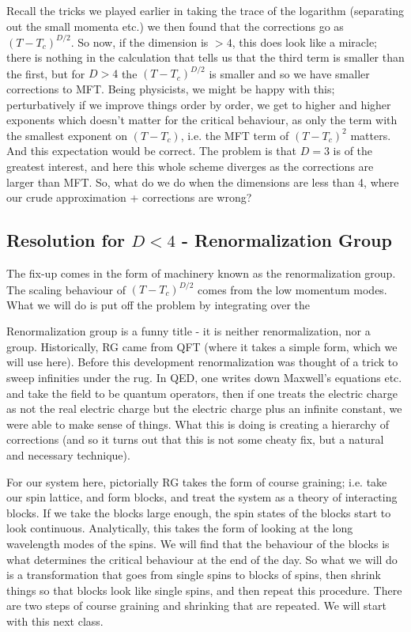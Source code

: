 Recall the tricks we played earlier in taking the trace of the logarithm (separating out the small momenta etc.) we then found that the corrections go as $(T - T_c)^{D/2}$. So now, if the dimension is $> 4$, this does look like a miracle; there is nothing in the calculation that tells us that the third term is smaller than the first, but for $D > 4$ the $(T - T_c)^{D/2}$ is smaller and so we have smaller corrections to MFT. Being physicists, we might be happy with this; perturbatively if we improve things order by order, we get to higher and higher exponents which doesn't matter for the critical behaviour, as only the term with the smallest exponent on $(T - T_c)$, i.e. the MFT term of $(T - T_c)^2$ matters. And this expectation would be correct. The problem is that $D = 3$ is of the greatest interest, and here this whole scheme diverges as the corrections are larger than MFT. So, what do we do when the dimensions are less than 4, where our crude approximation + corrections are wrong?

\subsection{Resolution for $D < 4$ - Renormalization Group}
The fix-up comes in the form of machinery known as the renormalization group. The scaling behaviour of $(T - T_c)^{D/2}$ comes from the low momentum modes. What we will do is put off the problem by integrating over the 

Renormalization group is a funny title - it is neither renormalization, nor a group. Historically, RG came from QFT (where it takes a simple form, which we will use here). Before this development renormalization was thought of a trick to sweep infinities under the rug. In QED, one writes down Maxwell's equations etc. and take the field to be quantum operators, then if one treats the electric charge as not the real electric charge but the electric charge plus an infinite constant, we were able to make sense of things. What this is doing is creating a hierarchy of corrections (and so it turns out that this is not some cheaty fix, but a natural and necessary technique). 

For our system here, pictorially RG takes the form of course graining; i.e. take our spin lattice, and form blocks, and treat the system as a theory of interacting blocks. If we take the blocks large enough, the spin states of the blocks start to look continuous. Analytically, this takes the form of looking at the long wavelength modes of the spins. We will find that the behaviour of the blocks is what determines the critical behaviour at the end of the day. So what we will do is a transformation that goes from single spins to blocks of spins, then shrink things so that blocks look like single spins, and then repeat this procedure. There are two steps of course graining and shrinking that are repeated. We will start with this next class.

